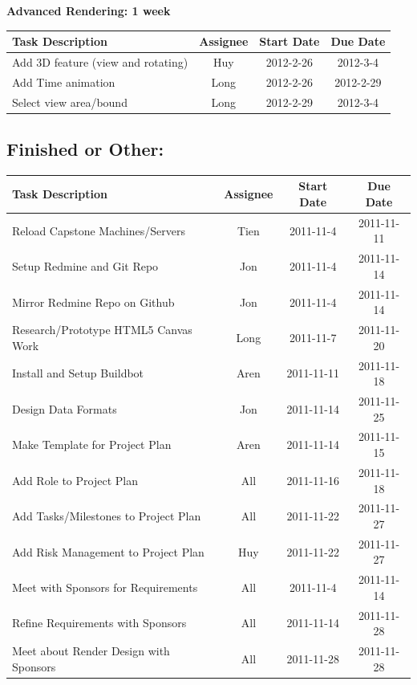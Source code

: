 \documentclass[12pt, letterpaper]{article}
\begin{document}
  \begin{center}
		{\bf Advanced Rendering: 1 week}
    \begin{tabular}{|p{8.3cm} || c | c | c | }
      \hline
      Task Description & Assignee & Start Date & Due Date \\
      \hline
	    Add 3D feature (view and rotating) & Huy & 2012-2-26 & 2012-3-4 \\
	    Add Time animation & Long & 2012-2-26 & 2012-2-29 \\
		Select view area/bound & Long & 2012-2-29 & 2012-3-4 \\
      \hline
    \end{tabular}
  \end{center}

	\subsection{Finished or Other:}

  \begin{center}
    \begin{tabular}{| p{8.3cm} || c | c | c | }
      \hline
      Task Description & Assignee & Start Date & Due Date \\
      \hline
			Reload Capstone Machines/Servers & Tien & 2011-11-4 & 2011-11-11\\
			Setup Redmine and Git Repo & Jon & 2011-11-4 & 2011-11-14 \\
			Mirror Redmine Repo on Github & Jon & 2011-11-4 & 2011-11-14 \\
			Research/Prototype HTML5 Canvas Work & Long & 2011-11-7 & 2011-11-20 \\
      Install and Setup Buildbot & Aren & 2011-11-11 & 2011-11-18 \\
            Design Data Formats & Jon & 2011-11-14 & 2011-11-25 \\
      Make Template for Project Plan & Aren & 2011-11-14 & 2011-11-15 \\
			Add Role to Project Plan & All & 2011-11-16 & 2011-11-18 \\
			Add Tasks/Milestones to Project Plan & All & 2011-11-22 & 2011-11-27\\
			Add Risk Management to Project Plan & Huy & 2011-11-22 & 2011-11-27\\
			Meet with Sponsors for Requirements & All & 2011-11-4 & 2011-11-14\\
			Refine Requirements with Sponsors & All & 2011-11-14 & 2011-11-28\\
			Meet about Render Design with Sponsors & All & 2011-11-28 & 2011-11-28 \\
      \hline
    \end{tabular}
  \end{center}
\end{document}
